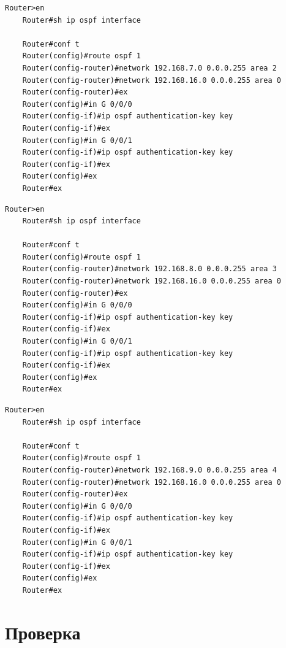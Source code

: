 \documentclass[a4paper,oneside,12pt]{extreport}
\begin{document}
\begin{lstlisting}[gobble=8, caption=Настройка маршрутизатора Router8]
	Router>en
	Router#sh ip ospf interface

	Router#conf t
	Router(config)#route ospf 1
	Router(config-router)#network 192.168.7.0 0.0.0.255 area 2
	Router(config-router)#network 192.168.16.0 0.0.0.255 area 0
	Router(config-router)#ex
	Router(config)#in G 0/0/0
	Router(config-if)#ip ospf authentication-key key
	Router(config-if)#ex
	Router(config)#in G 0/0/1
	Router(config-if)#ip ospf authentication-key key
	Router(config-if)#ex
	Router(config)#ex
	Router#ex
\end{lstlisting}

\begin{lstlisting}[gobble=8, caption=Настройка маршрутизатора Router9]
	Router>en
	Router#sh ip ospf interface

	Router#conf t
	Router(config)#route ospf 1
	Router(config-router)#network 192.168.8.0 0.0.0.255 area 3
	Router(config-router)#network 192.168.16.0 0.0.0.255 area 0
	Router(config-router)#ex
	Router(config)#in G 0/0/0
	Router(config-if)#ip ospf authentication-key key
	Router(config-if)#ex
	Router(config)#in G 0/0/1
	Router(config-if)#ip ospf authentication-key key
	Router(config-if)#ex
	Router(config)#ex
	Router#ex
\end{lstlisting}

\begin{lstlisting}[gobble=8, caption=Настройка маршрутизатора Router10]
	Router>en
	Router#sh ip ospf interface

	Router#conf t
	Router(config)#route ospf 1
	Router(config-router)#network 192.168.9.0 0.0.0.255 area 4
	Router(config-router)#network 192.168.16.0 0.0.0.255 area 0
	Router(config-router)#ex
	Router(config)#in G 0/0/0
	Router(config-if)#ip ospf authentication-key key
	Router(config-if)#ex
	Router(config)#in G 0/0/1
	Router(config-if)#ip ospf authentication-key key
	Router(config-if)#ex
	Router(config)#ex
	Router#ex
\end{lstlisting}

\section{Проверка}
\end{document}
